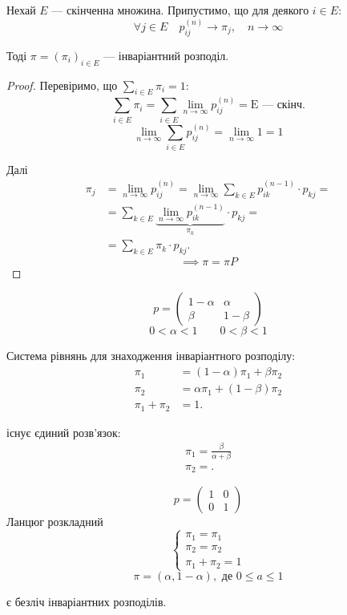 \begin{corollary}
  Нехай $E$ --- скінченна множина. Припустимо, що для деякого $i \in E$:
  \[ \forall j \in E \quad p^{(n)}_{ij} \to \pi_j, \quad n \to \infty \] 

  Тоді $\pi = \left( \pi_i \right) _{i\in E}$ --- інваріантний розподіл.
\end{corollary}
\begin{proof}
  Перевіримо, що $\sum_{i \in E}^{} \pi_i = 1$:
  \[ \sum_{i \in E}^{} \pi_i = \sum_{i \in E}^{} \lim_{n \to \infty} p^{(n)}_{ij} = \text{E --- скінч.} \] 
  \[ \lim_{n \to  \infty} \sum_{i \in E}^{} p^{(n)}_{ij} = \lim_{n \to  \infty} 1 = 1 \] 

  Далі
  \begin{align*}
    \pi_j &= \lim_{n \to \infty} p^{(n)}_{ij} = \lim_{n\to \infty} \sum_{k \in E}^{} p^{(n-1)}_{ik} \cdot p_{kj} = \\
          &= \sum_{k \in E}^{} \underbrace{\lim_{n \to  \infty} p^{(n-1)}_{ik}}_{\pi_k}
          \cdot  p_{kj} = \\
          &= \sum_{k \in E}^{} \pi_{k} \cdot p_{kj}
  .\end{align*}
  \[ \implies \pi = \pi P \] 
\end{proof}

\begin{example}
  \[ p = \begin{pmatrix} 1-\alpha & \alpha \\ \beta & 1-\beta \end{pmatrix}  \] 
  \[ 0 < \alpha < 1 \qquad 0 < \beta < 1 \] 

  Система рівнянь для знаходження інваріантного розподілу:
  \begin{align*}
    \pi_1 &= \left( 1-\alpha \right) \pi_1 + \beta \pi_2 \\
    \pi_2 &= \alpha \pi_1 + (1-\beta) \pi_2 \\
    \pi_1 + \pi_2 &= 1
  .\end{align*}

  існує єдиний розв'язок:
  \begin{align*}
    \pi_1 = \frac{\beta}{\alpha + \beta} \\
    \pi_2 = 
  .\end{align*}
\end{example}

\begin{example}
  \[ p = \begin{pmatrix} 1 & 0 \\ 0 & 1 \end{pmatrix}  \] 
  Ланцюг розкладний
  \[ \begin{cases}
    \pi_1 = \pi_1 \\
    \pi_2 = \pi_2 \\
    \pi_1 + \pi_2 = 1
  \end{cases} \] 
  \[ \pi = (\alpha, 1-\alpha), \text{ де $0 \leq a \leq 1$} \] 

  є безліч інваріантних розподілів.
\end{example}

